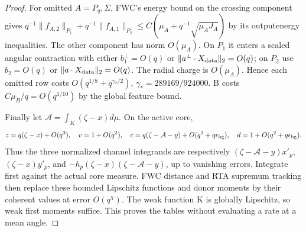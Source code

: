 \documentclass[11pt]{article}
\begin{document}
\begin{proof}
For omitted \(A=P_q,\Sigma\), FWC's energy bound on the crossing
component gives \(q^{-1}\|f_{A,2}\|_{P_1}+
q^{-1}\|f_{A,1}\|_{P_2}\le C(\mu_A+q^{-1}\sqrt{\mu_AJ_A})\)
by its outputenergy inequalities. The other component has norm
\(O(\mu_A)\). On \(P_1\) it enters a scaled angular contraction
with either \(b_1^\perp=O(q)\) or
\(\|a^\perp\cdot X_{\rm data}\|_2=O(q)\); on \(P_2\) use
\(b_2=O(q)\) or \(\|a\cdot X_{\rm data}\|_2=O(q)\).
The radial charge is \(O(\mu_A)\). Hence each omitted row costs
\(O(q^{1/8}+q^{\gamma_*/2})\), \(\gamma_*=289169/924000\).
B costs \(C\mu_B/q=O(q^{1/10})\) by the global feature bound.

Finally let \(\mathcal A=\int_K(\zeta-x)d\mu\). On the active core,
\[
z=q(\zeta-x)+O(q^3),\quad v=1+O(q^2),\quad
c=q(\zeta-\mathcal A-y)+O(q^3+q\epsilon_{\rm bg}),\quad
d=1+O(q^2+q\epsilon_{\rm bg}).
\]
Thus the three normalized channel integrands are respectively
\((\zeta-\mathcal A-y)x'_p\),
\((\zeta-x)y'_p\), and
\(-h_p(\zeta-x)(\zeta-\mathcal A-y)\), up to vanishing errors.
Integrate first against the actual core measure. FWC distance and
RTA supremum tracking then replace these bounded Lipschitz functions
and donor moments by their coherent values at error \(O(q^\chi)\).
The weak function K is globally Lipschitz, so weak first moments suffice.
This proves the tables without evaluating a rate at a mean angle.
\end{proof}
\end{document}
